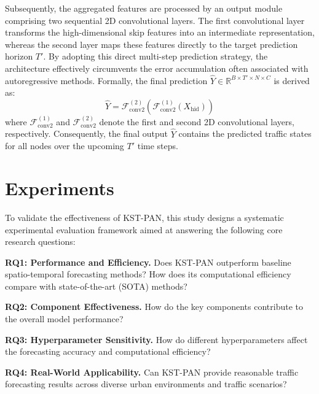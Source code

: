 \documentclass[5p,times,authoryear]{elsarticle}
\begin{document}
Subsequently, the aggregated features are processed by an output module comprising two sequential 2D convolutional layers. The first convolutional layer transforms the high-dimensional skip features into an intermediate representation, whereas the second layer maps these features directly to the target prediction horizon $T'$. By adopting this direct multi-step prediction strategy, the architecture effectively circumvents the error accumulation often associated with autoregressive methods. Formally, the final prediction $\hat{Y} \in \mathbb{R}^{B \times T' \times N \times C}$ is derived as:
\begin{equation}
\label{eq:decoder_output}
\hat{Y} = \mathcal{F}_{\text{conv2}}^{(2)}(\mathcal{F}_{\text{conv2}}^{(1)}(X_{\text{hid}}))
\end{equation}
where $\mathcal{F}_{\text{conv2}}^{(1)}$ and $\mathcal{F}_{\text{conv2}}^{(2)}$ denote the first and second 2D convolutional layers, respectively. Consequently, the final output $\hat{Y}$ contains the predicted traffic states for all nodes over the upcoming $T'$ time steps.


\section{Experiments}
To validate the effectiveness of KST-PAN, this study designs a systematic experimental evaluation framework aimed at answering the following core research questions:

\textbf{RQ1: Performance and Efficiency.} Does KST-PAN outperform baseline spatio-temporal forecasting methods? How does its computational efficiency compare with state-of-the-art (SOTA) methods?

\textbf{RQ2: Component Effectiveness.} How do the key components contribute to the overall model performance?

\textbf{RQ3: Hyperparameter Sensitivity.} How do different hyperparameters affect the forecasting accuracy and computational efficiency?

\textbf{RQ4: Real-World Applicability.} Can KST-PAN provide reasonable traffic forecasting results across diverse urban environments and traffic scenarios?




\end{document}

